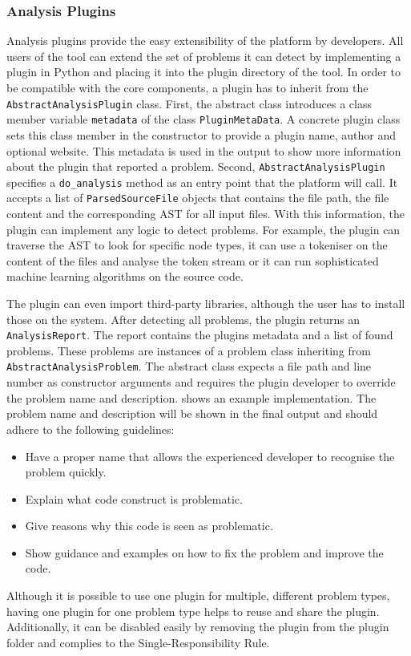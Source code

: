 \subsubsection{Analysis Plugins}\label{sec:analysis_plugins}
Analysis plugins provide the easy extensibility of the platform by developers. All users of the tool can extend the set of problems it can detect by implementing a plugin in Python and placing it into the plugin directory of the tool. In order to be compatible with the core components, a plugin has to inherit from the \texttt{AbstractAnalysisPlugin} class. First, the abstract class introduces a class member variable \texttt{metadata} of the class \texttt{PluginMetaData}. A concrete plugin class sets this class member in the constructor to provide a plugin name, author and optional website. This metadata is used in the output to show more information about the plugin that reported a problem. Second, \texttt{AbstractAnalysisPlugin} specifies a \texttt{do\_analysis} method as an entry point that the platform will call. It accepts a list of \texttt{ParsedSourceFile} objects that contains the file path, the file content and the corresponding AST for all input files. With this information, the plugin can implement any logic to detect problems. 
For example, the plugin can traverse the AST to look for specific node types, it can use a tokeniser on the content of the files and analyse the token stream or it can run sophisticated machine learning algorithms on the source code.

The plugin can even import third-party libraries, although the user has to install those on the system. After detecting all problems, the plugin returns an \texttt{AnalysisReport}. The report contains the plugins metadata and a list of found problems. 
These problems are instances of a problem class inheriting from \texttt{AbstractAnalysis\-Problem}. The abstract class expects a file path and line number as constructor arguments and requires the plugin developer to override the problem name and description.  shows an example implementation. The problem name and description will be shown in the final output and should adhere to the following guidelines:

\begin{itemize}
    \item Have a proper name that allows the experienced developer to recognise the problem quickly.
    \item Explain what code construct is problematic.
    \item Give reasons why this code is seen as problematic.
    \item Show guidance and examples on how to fix the problem and improve the code.
\end{itemize}
Although it is possible to use one plugin for multiple, different problem types, having one plugin for one problem type helps to reuse and share the plugin. Additionally, it can be disabled easily by removing the plugin from the plugin folder and complies to the Single-Responsibility Rule.


